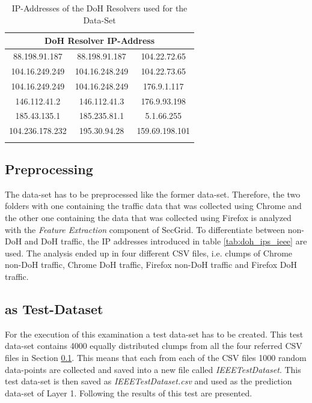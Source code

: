 \begin{center}
\begin{longtable}{ |c|c|c| }
\hline
\multicolumn{3}{|c|}{DoH Resolver IP-Address} \\
\hline
88.198.91.187 & 88.198.91.187 & 104.22.72.65 \\
\hline
104.16.249.249 & 104.16.248.249 & 104.22.73.65 \\
\hline
104.16.249.249 & 104.16.248.249 & 176.9.1.117 \\
\hline
146.112.41.2 & 146.112.41.3 & 176.9.93.198\\
\hline
185.43.135.1 & 185.235.81.1 & 5.1.66.255\\
\hline
104.236.178.232 & 195.30.94.28 & 159.69.198.101\\
\hline
\caption{IP-Addresses of the DoH Resolvers used for the Data-Set \cite{ieee_dataset}}
\end{longtable}
\label{tab:doh_ips_ieee}
\end{center}

\subsection{Preprocessing} \label{ieee_preproc}
The data-set has to be preprocessed like the former data-set. Therefore, the two folders with one containing the traffic data that was collected using Chrome and the other one containing the data that was collected using Firefox is analyzed with the \textit{Feature Extraction} component of SecGrid. To differentiate between non-DoH and DoH traffic, the IP addresses introduced in table \ref{tab:doh_ips_ieee} are used. The analysis ended up in four different CSV files, i.e. clumps of Chrome non-DoH traffic, Chrome DoH traffic, Firefox non-DoH traffic and Firefox DoH traffic.

\subsection{\cite{ieee_dataset} as Test-Dataset} \label{ieee_as_testing_ds}
For the execution of this examination a test data-set has to be created. This test data-set contains 4000 equally distributed clumps from all the four referred CSV files in Section \ref{ieee_preproc}. This means that each from each of the CSV files 1000 random data-points are collected and saved into a new file called \textit{IEEETestDataset}. This test data-set is then saved as \textit{IEEETestDataset.csv} and used as the prediction data-set of Layer 1. Following the results of this test are presented.

